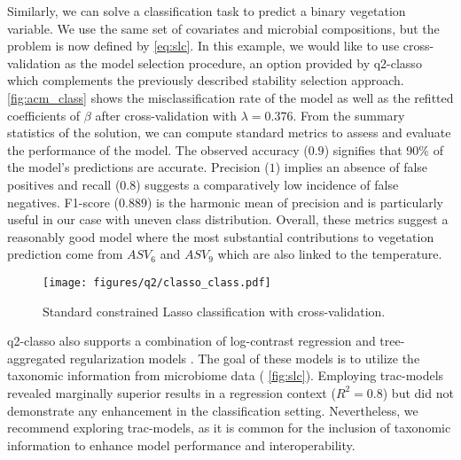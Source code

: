 \documentclass[10pt,a4paper]{article}
\let\cite\citep
\begin{document}
Similarly, we can solve a classification task to predict a binary vegetation variable. We use the same set of covariates and microbial compositions, but the problem is now defined by \autoref{eq:slc}. In this example, we would like to use cross-validation as the model selection procedure, an option provided by q2-classo which complements the previously described stability selection approach. \autoref{fig:acm_class} shows the misclassification rate of the model as well as the refitted coefficients of $\beta$ after cross-validation with $\lambda=0.376$. From the summary statistics of the solution, we can compute standard metrics to assess and evaluate the performance of the model. The observed accuracy ($0.9$) signifies that 90\% of the model's predictions are accurate. Precision ($1$) implies an absence of false positives and recall ($0.8$) suggests a comparatively low incidence of false negatives. F1-score ($0.889$) is the harmonic mean of precision and is particularly useful in our case with uneven class distribution. Overall, these metrics suggest a reasonably good model where the most substantial contributions to vegetation prediction come from $ASV_{6}$ and $ASV_{9}$ which are also linked to the temperature. 



\begin{figure}[h]
    \centering
    \texttt{[image: figures/q2/classo\_class.pdf]}
    \caption{Standard constrained Lasso classification with cross-validation.}
    \label{fig:acm_class}
\end{figure}




q2-classo also supports a combination of log-contrast regression and tree-aggregated regularization models \cite{bien2021tree}. The goal of these models is to utilize the taxonomic information from microbiome data (  \autoref{fig:slc}). Employing trac-models revealed marginally superior results in a regression context ($R^2=0.8$) but did not demonstrate any enhancement in the classification setting. Nevertheless, we recommend exploring trac-models, as it is common for the inclusion of taxonomic information to enhance model performance and interoperability.
\end{document}
